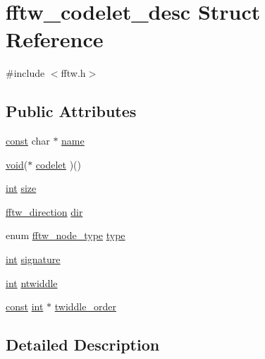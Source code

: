 \hypertarget{structfftw__codelet__desc}{}\section{fftw\+\_\+codelet\+\_\+desc Struct Reference}
\label{structfftw__codelet__desc}


{\ttfamily \#include $<$fftw.\+h$>$}

\subsection*{Public Attributes}
\begin{DoxyCompactItemize}
\item 
\hyperlink{getopt1_8c_a2c212835823e3c54a8ab6d95c652660e}{const} char $\ast$ \hyperlink{structfftw__codelet__desc_a2e0f3f98d154f213a77939edc509a42d}{name}
\item 
\hyperlink{sound_8c_ae35f5844602719cf66324f4de2a658b3}{void}($\ast$ \hyperlink{structfftw__codelet__desc_a1f2dadf462a51aad48c0489c066ff1f8}{codelet} )()
\item 
\hyperlink{xmltok_8h_a5a0d4a5641ce434f1d23533f2b2e6653}{int} \hyperlink{structfftw__codelet__desc_a195e2487dcd74ffc44f888612d25ac94}{size}
\item 
\hyperlink{fftw_8h_addfba51b1dc43e3660873b1ba9668cec}{fftw\+\_\+direction} \hyperlink{structfftw__codelet__desc_aec7e3024bee1423a31c5a3e628154d1c}{dir}
\item 
enum \hyperlink{fftw_8h_a62ecac3f39269a2efca878ca819349f1}{fftw\+\_\+node\+\_\+type} \hyperlink{structfftw__codelet__desc_a70eb46f55828f3b899272641c9d76949}{type}
\item 
\hyperlink{xmltok_8h_a5a0d4a5641ce434f1d23533f2b2e6653}{int} \hyperlink{structfftw__codelet__desc_a8cf3f5020d8697ef1e29cc2d82be0dae}{signature}
\item 
\hyperlink{xmltok_8h_a5a0d4a5641ce434f1d23533f2b2e6653}{int} \hyperlink{structfftw__codelet__desc_a2e68bbd836d4b760a1cd75c66409fd36}{ntwiddle}
\item 
\hyperlink{getopt1_8c_a2c212835823e3c54a8ab6d95c652660e}{const} \hyperlink{xmltok_8h_a5a0d4a5641ce434f1d23533f2b2e6653}{int} $\ast$ \hyperlink{structfftw__codelet__desc_a655dd809b3b9a6f6c0676879f08b05a1}{twiddle\+\_\+order}
\end{DoxyCompactItemize}


\subsection{Detailed Description}


